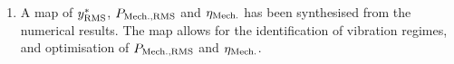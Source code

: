 \documentclass[oneside]{utmthesis}
\begin{document}
\begin{enumerate}

  \item A map of $y^{*}_{\text{RMS}}$, $P_{\text{Mech.,RMS}}$ and $\eta_{\text{Mech.}}$ has been synthesised from the numerical results. The map allows for the identification of vibration regimes, and optimisation of $P_{\text{Mech.,RMS}}$ and $\eta_{\text{Mech.}}$.

\end{enumerate}
\end{document}
